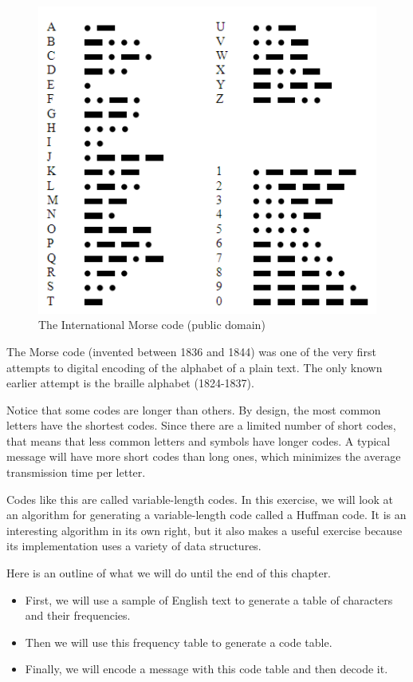 \begin{figure}
\centerline
{\includegraphics[scale=0.6]{figs/International_Morse_Code.PNG}}
\caption{The International Morse code (public domain)}
\label{fig.morse}
\end{figure}

The Morse code (invented between 1836 and 1844) was one of the 
very first attempts to digital encoding of the alphabet of a 
plain text. The only known earlier attempt is the braille 
alphabet (1824-1837).

Notice that some codes are longer than others. By design, the 
most common letters have the shortest codes. Since there are a 
limited number of short codes, that means that less common letters 
and symbols have longer codes. A typical message will have more 
short codes than long ones, which minimizes the average 
transmission time per letter.

Codes like this are called variable-length codes. In this exercise, 
we will look at an algorithm for generating a variable-length code 
called a Huffman code. It is an interesting algorithm in its own 
right, but it also makes a useful exercise because its implementation 
uses a variety of data structures.

Here is an outline of what we will do until the end of this 
chapter.

\begin{itemize}
\item First, we will use a sample of English text to generate 
a table of characters and their frequencies.

\item Then we will use this frequency table to generate a code 
table.

\item Finally, we will encode a message with this code table 
and then decode it.

\end{itemize}

